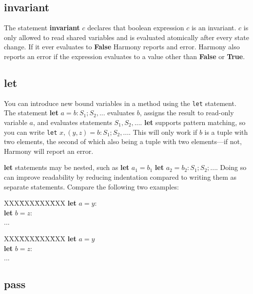 \documentclass{report}
\newenvironment{code}{
\tcolorbox
}{
\endtcolorbox
}
\begin{document}
\subsection*{\textbf{invariant}}

The statement \textbf{invariant} $c$ declares that boolean expression $c$
is an invariant.  $c$ is only allowed to read shared variables and
is evaluated atomically after every state change.
If it ever evaluates to \textbf{False} Harmony reports and error.  Harmony
also reports an error if the expression evaluates to a value other
than \textbf{False} or \textbf{True}.

\subsection*{\textbf{let}}

You can introduce new bound variables in a method using the
\texttt{let} statement.
The statement \textbf{let} $a = b: S_1; S_2, ...$ evaluates $b$, assigns
the result to read-only variable $a$, and evaluates statements
$S_1, S_2, ...$.  \textbf{let} supports pattern matching, so you can
write \texttt{let} $x, (y, z) = b: S_1; S_2, ...$.  This will only work
if $b$ is a tuple with two elements, the second of which also being a
tuple with two elements---if not, Harmony will report an error.

\textbf{let} statements may be nested, such as
\textbf{let} $a_1 = b_1$ \textbf{let} $a_2 = b_2: S_1; S_2; ...$.
Doing so can improve readability by reducing indentation
compared to writing them as separate statements.
Compare the following two examples:

\begin{code}
\begin{tabbing}
XXX\=XXX\=XXX\=XXX\kill
\>\textbf{let} $a = y$: \\
\>\>\textbf{let} $b = z$: \\
\>\>\>...
\end{tabbing}
\end{code}
\begin{code}
\begin{tabbing}
XXX\=XXX\=XXX\=XXX\kill
\>\textbf{let} $a = y$ \\
\>\textbf{let} $b = z$: \\
\>\>...
\end{tabbing}
\end{code}

\subsection*{\textbf{pass}}
\end{document}
